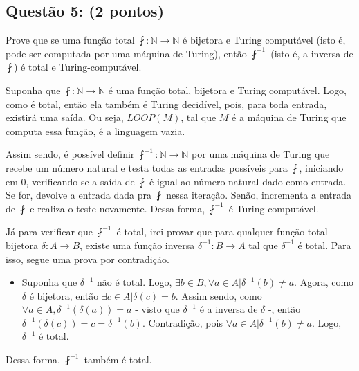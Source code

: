 \documentclass{article}
\begin{document}
\subsection*{Questão 5: (2 pontos)} Prove que se uma função total $\fint : \mathds{N} \to \mathds{N}$ é bijetora e Turing computável (isto é, pode ser computada por uma máquina de Turing), então $\fint^{-1}$ (isto é, a inversa de $\fint$) é total e Turing-computável.

{
\color{blue}
  \par Suponha que $\fint : \mathds{N} \to \mathds{N}$ é uma função total, bijetora e Turing computável. Logo, como é total, então ela também é Turing decidível, pois, para toda entrada, existirá uma saída. Ou seja, $LOOP(M)$, tal que $M$ é a máquina de Turing que computa essa função, é a linguagem vazia.
  \par Assim sendo, é possível definir $\fint^{-1} : \mathds{N} \to \mathds{N}$ por uma máquina de Turing que recebe um número natural e testa todas as entradas possíveis para $\fint$, iniciando em 0, verificando se a saída de $\fint$ é igual ao número natural dado como entrada. Se for, devolve a entrada dada pra $\fint$ nessa iteração. Senão, incrementa a entrada de $\fint$ e realiza o teste novamente. Dessa forma, $\fint^{-1}$ é Turing computável.
  \par Já para verificar que $\fint^{-1}$ é total, irei provar que para qualquer função total bijetora $\delta: A \to B$, existe uma função inversa $\delta^{-1}: B \to A$ tal que $\delta^{-1}$ é total. Para isso, segue uma prova por contradição.
  \begin{itemize}
    \item Suponha que $\delta^{-1}$ não é total. Logo, $\exists b \in B, \forall a \in A | \delta^{-1}(b) \neq a$. Agora, como $\delta$ é bijetora, então $\exists c \in A | \delta(c) = b$. Assim sendo, como $\forall a \in A, \delta^{-1}(\delta(a))=a$ - visto que $\delta^{-1}$ é a inversa de $\delta$ -, então $\delta^{-1}(\delta(c))=c=\delta^{-1}(b)$. Contradição, pois $\forall a \in A | \delta^{-1}(b) \neq a$. Logo, $\delta^{-1}$ é total.
  \end{itemize}
  Dessa forma, $\fint^{-1}$ também é total.
}
\end{document}
